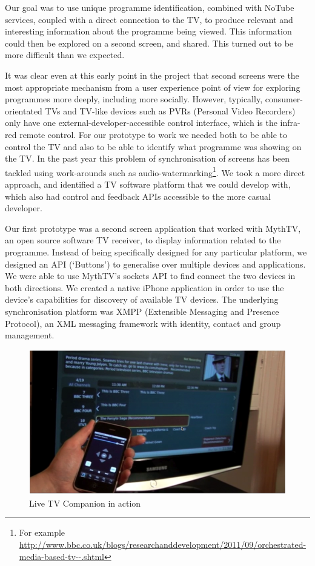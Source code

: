 \documentclass{notube}
\begin{document}
Our goal was to use unique programme identification, combined with NoTube services, coupled with a direct connection to the TV, to produce relevant and interesting information about the programme being viewed. This information could then be explored on a second screen, and shared. This turned out to be more difficult than we expected.

It was clear even at this early point in the project that second screens were the most appropriate mechanism from a user experience point of view for exploring programmes more deeply, including more socially. However, typically, consumer-orientated TVs and TV-like devices such as PVRs (Personal Video Recorders) only have one external-developer-accessible control interface, which is the infra-red remote control. For our prototype to work we needed both to be able to control the TV and also to be able to identify what programme was showing on the TV. In the past year this problem of synchronisation of screens has been tackled using work-arounds such as audio-watermarking\footnote{For example \url{http://www.bbc.co.uk/blogs/researchanddevelopment/2011/09/orchestrated-media-based-tv--.shtml}}. We took a more direct approach, and identified a TV software platform that we could develop with, which also had control and feedback APIs accessible to the more casual developer.

Our first prototype was a second screen application that worked with MythTV, an open source software TV receiver, to display information related to the programme. Instead of being specifically designed for any particular platform, we designed an API (`Buttons') to generalise over multiple devices and applications. We were able to use MythTV's sockets API to find connect the two devices in both directions. We created a native iPhone application in order to use the device's capabilities for discovery of available TV devices. The underlying synchronisation platform was XMPP (Extensible Messaging and Presence Protocol), an XML messaging framework with identity, contact and group management. 

\begin{figure}[htbp]
\begin{center}
\includegraphics[width=6in]{images/year1.png}
\caption{Live TV Companion in action} \label{fig:year1}
\end{center}
\end{figure} 
\end{document}

